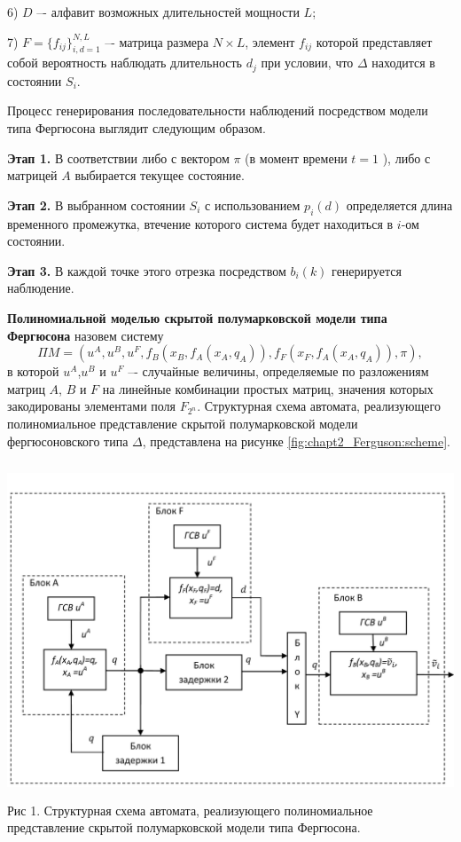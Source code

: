 \documentclass[twoside,12pt]{article}
\begin{document}
6) $D$ –- алфавит возможных длительностей мощности $L$;

7) $F=\{f_{ij}\}_{i,d=1}^{N,L}$ –- матрица размера $N\times L$, элемент $f_{ij}$  которой представляет собой вероятность наблюдать длительность $d_j$ при условии, что $\Delta$ находится в состоянии $S_i$.

Процесс генерирования последовательности наблюдений посредством модели типа Фергюсона выглядит следующим образом.

 \textbf{Этап 1.} В соответствии либо с вектором $\pi$ (в момент времени $t=1$ ), либо с матрицей $A$ выбирается текущее состояние.

 \textbf{Этап 2.} В выбранном состоянии $S_i$ с использованием $p_i(d)$ определяется длина временного промежутка, втечение которого система будет находиться в $i$-ом состоянии.

 \textbf{Этап 3.} В каждой точке этого отрезка посредством $b_i(k)$ генерируется наблюдение.

\textbf{Полиномиальной моделью скрытой полумарковской модели типа Фергюсона} назовем систему
$$\Pi M=(u^A,u^B,u^F,f_B (x_B,f_A (x_A,q_A )),f_F (x_F,f_A (x_A,q_A )),\pi),$$
в которой $u^A$,$u^B$ и $u^F$ –- случайные величины, определяемые по разложениям матриц $A$, $B$ и $F$ на линейные комбинации простых матриц, значения которых закодированы элементами поля $F_{2^n}$.
Структурная схема автомата, реализующего полиномиальное представление скрытой полумарковской модели фергюсоновского типа $\Delta$, представлена на рисунке \ref{fig:chapt2_Ferguson:scheme}.

\begin{center}\label{fig:chapt2_Ferguson:scheme}
  \includegraphics[height=100mm]{Structural_model.jpg}
 Рис 1. Структурная схема автомата, реализующего полиномиальное представление скрытой полумарковской модели типа Фергюсона.
  \end{center}
\end{document}
